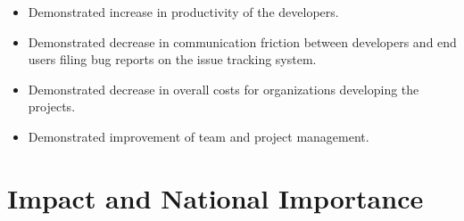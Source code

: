 \documentclass[11pt,english,twocolumn]{article}
\begin{document}
\begin{itemize}
	\item Demonstrated increase in productivity of the developers.
	\item Demonstrated decrease in communication friction between developers and end users
	filing bug reports on the issue tracking system.
	\item Demonstrated decrease in overall costs for organizations developing the projects.
	\item Demonstrated improvement of team and project management.
\end{itemize}

\section{Impact and National Importance}

\let\oldbibliography\thebibliography
\renewcommand{\thebibliography}[1]{\oldbibliography{#1}
\setlength{\itemsep}{-3pt}}


{
\scriptsize

}
\end{document}
